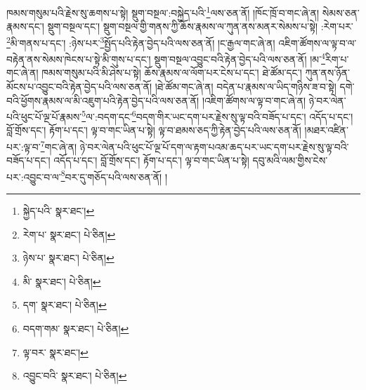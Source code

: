 ཁམས་གསུམ་པའི་རྗེས་སུ་ཆགས་པ་སྟེ། སྡུག་བསྔལ་:བསྐྱེད་པའི་\footnote{སྐྱེད་པའི་  སྣར་ཐང་། }ལས་ཅན་ནོ། །ཁོང་ཁྲོ་བ་གང་ཞེ་ན། སེམས་ཅན་རྣམས་དང་། སྡུག་བསྔལ་དང་། སྡུག་བསྔལ་གྱི་གནས་ཀྱི་ཆོས་རྣམས་ལ་ཀུན་ནས་མནར་སེམས་པ་སྟེ། :རེག་པར་\footnote{རེག་པ་  སྣར་ཐང་།  པེ་ཅིན། }མི་གནས་པ་དང་། :ཉེས་པར་\footnote{ཉེས་པ་  སྣར་ཐང་།  པེ་ཅིན། }སྤྱོད་པའི་རྟེན་བྱེད་པའི་ལས་ཅན་ནོ། །ང་རྒྱལ་གང་ཞེ་ན། འཇིག་ཚོགས་ལ་ལྟ་བ་ལ་བརྟེན་ནས་སེམས་ཁེངས་པ་སྟེ་མི་གུས་པ་དང་། སྡུག་བསྔལ་འབྱུང་བའི་རྟེན་བྱེད་པའི་ལས་ཅན་ནོ། །མ་\footnote{མི་  སྣར་ཐང་།  པེ་ཅིན། }རིག་པ་གང་ཞེ་ན། ཁམས་གསུམ་པའི་མི་ཤེས་པ་སྟེ། ཆོས་རྣམས་ལ་ལོག་པར་ངེས་པ་དང་། ཐེ་ཚོམ་དང་། ཀུན་ནས་ཉོན་མོངས་པ་འབྱུང་བའི་རྟེན་བྱེད་པའི་ལས་ཅན་ནོ། །ཐེ་ཚོམ་གང་ཞེ་ན། བདེན་པ་རྣམས་ལ་ཡིད་གཉིས་ཟ་བ་སྟེ། དགེ་བའི་ཕྱོགས་རྣམས་ལ་མི་འཇུག་པའི་རྟེན་བྱེད་པའི་ལས་ཅན་ནོ། །འཇིག་ཚོགས་ལ་ལྟ་བ་གང་ཞེ་ན། ཉེ་བར་ལེན་པའི་ཕུང་པོ་ལྔ་པོ་རྣམས་\footnote{དག་  སྣར་ཐང་།  པེ་ཅིན། }ལ་:བདག་དང་\footnote{བདག་གམ་  སྣར་ཐང་།  པེ་ཅིན། }བདག་གིར་ཡང་དག་པར་རྗེས་སུ་ལྟ་བའི་བཟོད་པ་དང་། འདོད་པ་དང་། བློ་གྲོས་དང་། རྟོག་པ་དང་། ལྟ་བ་གང་ཡིན་པ་སྟེ། ལྟ་བ་ཐམས་ཅད་ཀྱི་རྟེན་བྱེད་པའི་ལས་ཅན་ནོ། །མཐར་འཛིན་པར་:ལྟ་བ་\footnote{ལྟ་བར་  སྣར་ཐང་། }གང་ཞེ་ན། ཉེ་བར་ལེན་པའི་ཕུང་པོ་ལྔ་པོ་དག་ལ་རྟག་པའམ་ཆད་པར་ཡང་དག་པར་རྗེས་སུ་ལྟ་བའི་བཟོད་པ་དང་། འདོད་པ་དང་། བློ་གྲོས་དང་། རྟོག་པ་དང་། ལྟ་བ་གང་ཡིན་པ་སྟེ། དབུ་མའི་ལམ་གྱིས་ངེས་པར་:འབྱུང་བ་ལ་\footnote{འབྱུང་བའི་  སྣར་ཐང་།  པེ་ཅིན། }བར་དུ་གཅོད་པའི་ལས་ཅན་ནོ། །
